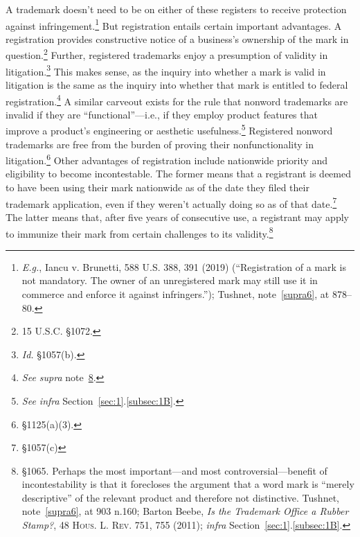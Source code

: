 \documentclass[letterpaper, 11pt, oneside]{article}
\begin{document}
A trademark doesn't need to be on either of these registers to receive protection against infringement.\footnote{\textit{E.g.}, Iancu v. Brunetti, 588 U.S. 388, 391 (2019) (``Registration of a mark is not mandatory. The owner of an unregistered mark may still use it in commerce and enforce it against infringers.''); Tushnet, note~\ref{supra6}, at 878–80.} But registration entails certain important advantages. A registration provides constructive notice of a business's ownership of the mark in question.\footnote{15 U.S.C. \S 1072.} Further, registered trademarks enjoy a presumption of validity in litigation.\footnote{\textit{Id.} \S 1057(b).}  This makes sense, as the inquiry into whether a mark is valid in litigation is the same as the inquiry into whether that mark is entitled to federal registration.\footnote{\textit{See supra} note~\ref{supra8}.} A similar carveout exists for the rule that nonword trademarks are invalid if they are ``functional''—i.e., if they employ product features that improve a product's engineering or aesthetic usefulness.\footnote{\textit{See infra} Section~\ref{sec:1}.\ref{subsec:1B}.} Registered nonword trademarks are free from the burden of proving their nonfunctionality in litigation.\footnote{\S 1125(a)(3).}  Other advantages of registration include nationwide priority and eligibility to become incontestable. The former means that a registrant is deemed to have been using their mark nationwide as of the date they filed their trademark application, even if they weren't actually doing so as of that date.\footnote{\S 1057(c)} The latter means that, after five years of consecutive use, a registrant may apply to immunize their mark from certain challenges to its validity.\footnote{\label{supra8} \S 1065. Perhaps the most important—and most controversial—benefit of incontestability is that it forecloses the argument that a word mark is ``merely descriptive'' of the relevant product and therefore not distinctive. Tushnet, note~\ref{supra6}, at 903 n.160; Barton Beebe, \textit{Is the Trademark Office a Rubber Stamp?}, 48 \textsc{Hous. L. Rev.} 751, 755 (2011); \textit{infra} Section~\ref{sec:1}.\ref{subsec:1B}.}
\end{document}
